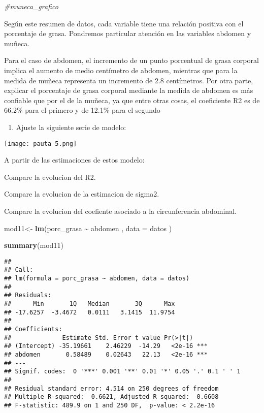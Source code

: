 \documentclass[
]{article}
\newenvironment{Shaded}{\begin{snugshade}}{\end{snugshade}}
\newcommand{\AttributeTok}[1]{\textcolor[rgb]{0.13,0.29,0.53}{#1}}
\newcommand{\CommentTok}[1]{\textcolor[rgb]{0.56,0.35,0.01}{\textit{#1}}}
\newcommand{\FunctionTok}[1]{\textcolor[rgb]{0.13,0.29,0.53}{\textbf{#1}}}
\newcommand{\NormalTok}[1]{#1}
\newcommand{\OtherTok}[1]{\textcolor[rgb]{0.56,0.35,0.01}{#1}}
\newcommand{\SpecialCharTok}[1]{\textcolor[rgb]{0.81,0.36,0.00}{\textbf{#1}}}
\providecommand{\tightlist}{%
  \setlength{\itemsep}{0pt}\setlength{\parskip}{0pt}}
\begin{document}
\begin{Shaded}
\begin{Highlighting}[]
\CommentTok{\#muneca\_grafico}
\end{Highlighting}
\end{Shaded}

Según este resumen de datos, cada variable tiene una relación positiva
con el porcentaje de grasa. Pondremos particular atención en las
variables abdomen y muñeca.

Para el caso de abdomen, el incremento de un punto porcentual de grasa
corporal implica el aumento de medio centímetro de abdomen, mientras que
para la medida de muñeca representa un incremento de 2.8 centímetros.
Por otra parte, explicar el porcentaje de grasa corporal mediante la
medida de abdomen es más confiable que por el de la muñeca, ya que entre
otras cosas, el coeficiente R2 es de 66.2\% para el primero y de 12.1\%
para el segundo

\begin{enumerate}
\def\labelenumi{\arabic{enumi}.}
\setcounter{enumi}{4}
\tightlist
\item
  Ajuste la siguiente serie de modelo:
\end{enumerate}

\texttt{[image: pauta 5.png]}

A partir de las estimaciones de estos modelo:

Compare la evolucion del R2.

Compare la evolucion de la estimacion de sigma2.

Compare la evolucion del coefiente asociado a la circunferencia
abdominal.

\begin{Shaded}
\begin{Highlighting}[]
\NormalTok{mod11}\OtherTok{\textless{}{-}} \FunctionTok{lm}\NormalTok{(porc\_grasa }\SpecialCharTok{\textasciitilde{}}\NormalTok{  abdomen , }\AttributeTok{data =}\NormalTok{ datos )}

\FunctionTok{summary}\NormalTok{(mod11)}
\end{Highlighting}
\end{Shaded}

\begin{verbatim}
## 
## Call:
## lm(formula = porc_grasa ~ abdomen, data = datos)
## 
## Residuals:
##      Min       1Q   Median       3Q      Max 
## -17.6257  -3.4672   0.0111   3.1415  11.9754 
## 
## Coefficients:
##              Estimate Std. Error t value Pr(>|t|)    
## (Intercept) -35.19661    2.46229  -14.29   <2e-16 ***
## abdomen       0.58489    0.02643   22.13   <2e-16 ***
## ---
## Signif. codes:  0 '***' 0.001 '**' 0.01 '*' 0.05 '.' 0.1 ' ' 1
## 
## Residual standard error: 4.514 on 250 degrees of freedom
## Multiple R-squared:  0.6621, Adjusted R-squared:  0.6608 
## F-statistic: 489.9 on 1 and 250 DF,  p-value: < 2.2e-16
\end{verbatim}
\end{document}
